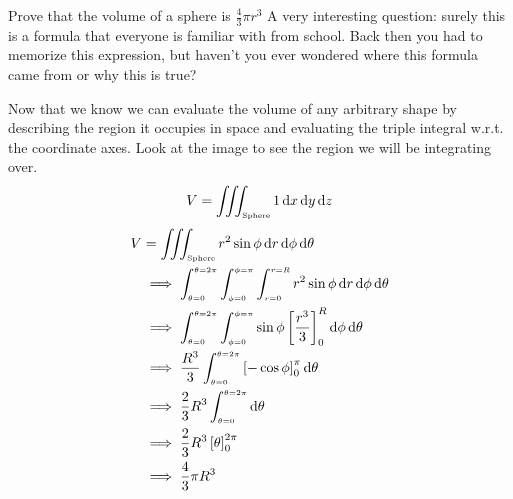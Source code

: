 \documentclass[14pt]{article}
\begin{document}
	\begin{example}{Prove that the volume of a sphere is $\frac{4}{3}\pi r^3$}{}
		A very interesting question: surely this is a formula that everyone is familiar with from school. Back then you had to memorize this expression, but haven't you ever wondered where this formula came from or why this is true? 
		
		Now that we know we can evaluate the volume of any arbitrary shape by describing the region it occupies in space and evaluating the triple integral w.r.t. the coordinate axes. Look at the image to see the region we will be integrating over.
		\begin{equation*}
			V = \iiint_{\text{\tiny Sphere}} 1 \odif{x, y, z}
		\end{equation*}
		\begin{equation*}
			\begin{split}
				V & = \iiint_{\text{\tiny Sphere}} r^2 \sin{\phi} \odif{r, \phi, \theta} \\
				& \implies \int_{\scriptscriptstyle \theta=0}^{\scriptscriptstyle \theta=2\pi} \int_{\scriptscriptstyle\phi=0}^{\scriptscriptstyle\phi=\pi} \int_{\scriptscriptstyle r=0}^{\scriptscriptstyle r=R} r^2 \sin{\phi} \odif{r, \phi, \theta} \\
				& \implies \int_{\scriptscriptstyle\theta=0}^{\scriptscriptstyle\theta=2\pi} \int_{\scriptscriptstyle\phi=0}^{\scriptscriptstyle\phi=\pi} \sin{\phi} \left[\frac{r^3}{3}\right]_0^R \odif{\phi, \theta} \\
				& \implies \frac{R^3}{3} \int_{\scriptscriptstyle\theta=0}^{\scriptscriptstyle\theta=2\pi} \left[-\cos{\phi}\right]_0^\pi \odif{\theta} \\
				& \implies \frac{2}{3} R^3 \int_{\scriptscriptstyle\theta=0}^{\scriptscriptstyle\theta=2\pi} \odif{\theta} \\
				& \implies \frac{2}{3} R^3 \left[\theta\right]_0^{2\pi} \\
				& \implies \frac{4}{3} \pi R^3
			\end{split}
		\end{equation*}
		
	\end{example}
\end{document}

